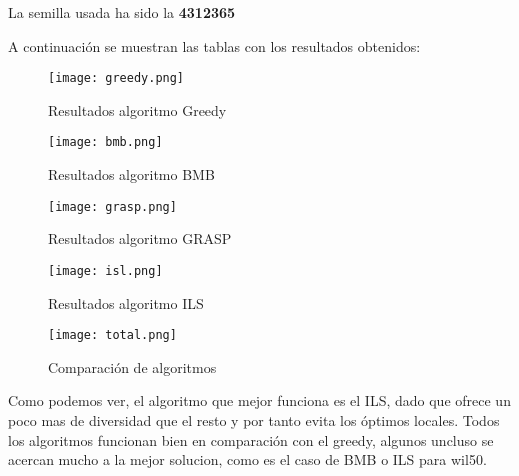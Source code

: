 La semilla usada ha sido la \textbf{4312365} 

A continuación se muestran las tablas con los resultados obtenidos:

\begin{figure}[H]
\centering
\texttt{[image: greedy.png]}
\caption{Resultados algoritmo Greedy}
\label{}
\end{figure}


\begin{figure}[H]
\centering
\texttt{[image: bmb.png]}
\caption{Resultados algoritmo BMB}
\label{}
\end{figure}


\begin{figure}[H]
\centering
\texttt{[image: grasp.png]}
\caption{Resultados algoritmo GRASP}
\label{}
\end{figure}


\begin{figure}[H]
\centering
\texttt{[image: isl.png]}
\caption{Resultados algoritmo ILS}
\label{}
\end{figure}


\begin{figure}[H]
\centering
\texttt{[image: total.png]}
\caption{Comparación de algoritmos}
\label{}
\end{figure}

Como podemos ver, el algoritmo que mejor funciona es el ILS, dado que ofrece un poco mas de diversidad que el resto y por tanto evita los óptimos locales. Todos los algoritmos funcionan bien en comparación con el greedy, algunos uncluso se acercan mucho a la mejor solucion, como es el caso de BMB o ILS para wil50.

